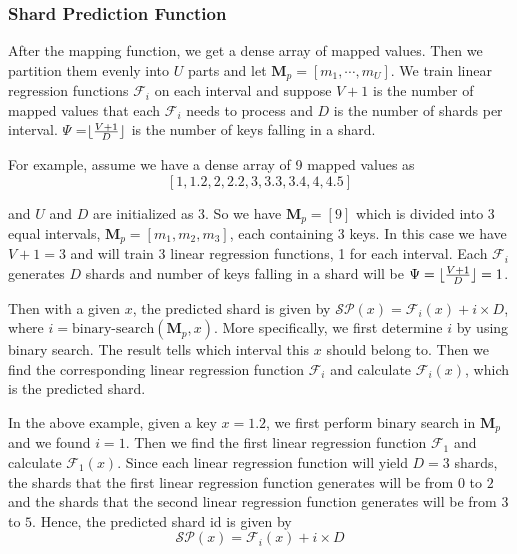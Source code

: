 \subsubsection{Shard Prediction Function}

After the mapping function, we get a dense array of mapped values. Then we partition them evenly into $U$ parts and let $\boldsymbol{M}_p=[m_1,\cdots, m_U]$. We train linear regression functions $\mathcal{F}_i$ on each interval and suppose $V+1$ is the number of mapped values that each $\mathcal{F}_i$ needs to process and $D$ is the number of shards per interval. $\Psi$ =$\lfloor\frac{V+1}{D}\rfloor$ is the number of keys falling in a shard. %

\begin{mscexample}
	For example, assume we have a dense array of 9 mapped values as $$[1,1.2,2, 2.2,3,3.3,3.4,4, 4.5]$$
	
and $U$ and $D$ are initialized as 3. So we have $\boldsymbol{M}_p=[9]$ which is divided into 3 equal intervals, $\boldsymbol{M}_p=[m_1, m_2, m_3]$, each containing 3 keys. In this case we have $V+1 = 3$ and will train $3$ linear regression functions, 1 for each interval. Each $\mathcal{F}_i$ generates $D$ shards and number of keys falling in a shard will be $\Psi= \lfloor\frac{V+1}{D}\rfloor = 1$.
\end{mscexample}


Then with a given $x$, the predicted shard is given by $\mathcal{SP}(x)=\mathcal{F}_i(x)+i\times D$, where $i=\text{binary-search}(\boldsymbol{M}_p,x)$. More specifically, we first determine $i$ by using binary search. The result tells which interval this $x$ should belong to. Then we find the corresponding linear regression function $\mathcal{F}_i$ and calculate $\mathcal{F}_i(x)$, which is the predicted shard.

\begin{mscexample}
	In the above example, given a key $x=1.2$, we first perform binary search in $\boldsymbol{M}_p$ and we found $i=1$. Then we find the first linear regression function $\mathcal{F}_1$ and calculate $\mathcal{F}_1(x)$. Since each linear regression function will yield $D=3$ shards, the shards that the first linear regression function generates will be from $0$ to $2$ and the shards that the second linear regression function generates will be from $3$ to $5$. Hence, the predicted shard id is given by 
$$
\mathcal{SP}(x)=\mathcal{F}_i(x)+i\times D
$$
\end{mscexample}

